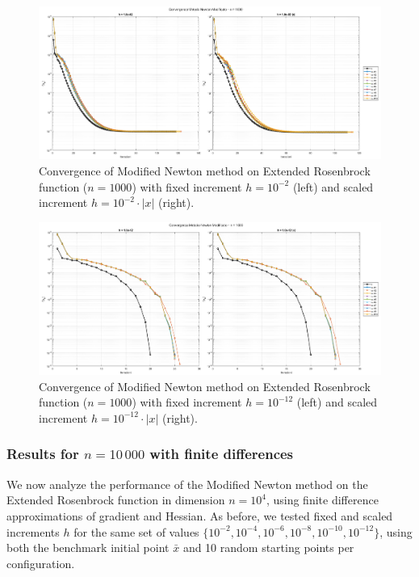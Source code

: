 \documentclass[a4paper,12pt]{article}
\begin{document}
	\newpage
	\begin{figure}[H]
		\centering
		\includegraphics[width=\textwidth]{../immagini/ext_1k_h2.png}
		\caption{Convergence of Modified Newton method on Extended Rosenbrock function ($n=1000$) with fixed increment $h = 10^{-2}$ (left) and scaled increment $h = 10^{-2}\cdot|x|$ (right).}
		\label{fig:fd_1k_h2}
	\end{figure}
	
	\begin{figure}[htbp]
		\centering
		\includegraphics[width=\textwidth]{../immagini/ext_1k_h12.png}
		\caption{Convergence of Modified Newton method on Extended Rosenbrock function ($n=1000$) with fixed increment $h = 10^{-12}$ (left) and scaled increment $h = 10^{-12}\cdot|x|$ (right).}
		\label{fig:fd_1k_h12}
	\end{figure}
	
	\newpage
	\subsubsection*{Results for $n = 10\,000$ with finite differences}
	
	We now analyze the performance of the Modified Newton method on the Extended Rosenbrock function in dimension \( n = 10^4 \), using finite difference approximations of gradient and Hessian. As before, we tested fixed and scaled increments \( h \) for the same set of values \( \{10^{-2}, 10^{-4}, 10^{-6}, 10^{-8}, 10^{-10}, 10^{-12}\} \), using both the benchmark initial point \( \bar{x} \) and 10 random starting points per configuration.
	
\end{document}

